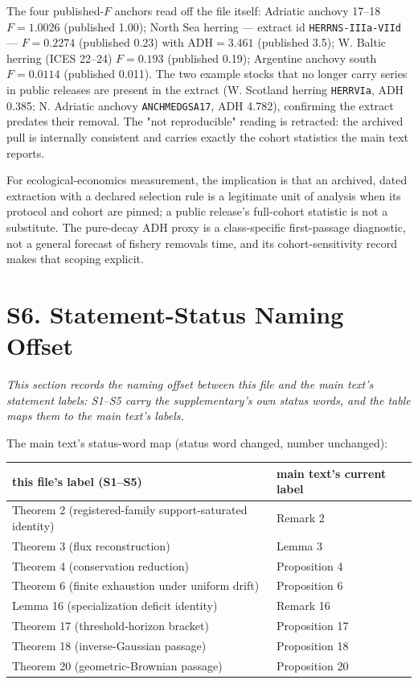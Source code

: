 \documentclass[11pt]{article}
\begin{document}
The four published-\(F\) anchors read off the file itself: Adriatic anchovy 17--18 \(F=1.0026\) (published 1.00); North Sea herring --- extract id \texttt{HERRNS-IIIa-VIId} --- \(F=0.2274\) (published 0.23) with \(\mathrm{ADH}=3.461\) (published 3.5); W. Baltic herring (ICES 22--24) \(F=0.193\) (published 0.19); Argentine anchovy south \(F=0.0114\) (published 0.011). The two example stocks that no longer carry series in public releases are present in the extract (W. Scotland herring \texttt{HERRVIa}, ADH 0.385; N. Adriatic anchovy \texttt{ANCHMEDGSA17}, ADH 4.782), confirming the extract predates their removal. The "not reproducible" reading is retracted: the archived pull is internally consistent and carries exactly the cohort statistics the main text reports.

For ecological-economics measurement, the implication is that an archived, dated extraction with a declared selection rule is a legitimate unit of analysis when its protocol and cohort are pinned; a public release's full-cohort statistic is not a substitute. The pure-decay ADH proxy is a class-specific first-passage diagnostic, not a general forecast of fishery removals time, and its cohort-sensitivity record makes that scoping explicit.

\section*{S6. Statement-Status Naming Offset}\label{s6-statement-status-naming-offset}

\emph{This section records the naming offset between this file and the main text's statement labels: S1--S5 carry the supplementary's own status words, and the table maps them to the main text's labels.}

The main text's status-word map (status word changed, number unchanged):

\begin{longtable}{@{}p{109mm}|l@{}}
\toprule
this file's label (S1--S5) & main text's current label \\
\midrule
Theorem 2 (registered-family support-saturated identity) & Remark 2 \\
Theorem 3 (flux reconstruction) & Lemma 3 \\
Theorem 4 (conservation reduction) & Proposition 4 \\
Theorem 6 (finite exhaustion under uniform drift) & Proposition 6 \\
Lemma 16 (specialization deficit identity) & Remark 16 \\
Theorem 17 (threshold-horizon bracket) & Proposition 17 \\
Theorem 18 (inverse-Gaussian passage) & Proposition 18 \\
Theorem 20 (geometric-Brownian passage) & Proposition 20 \\
\bottomrule
\end{longtable}
\end{document}
